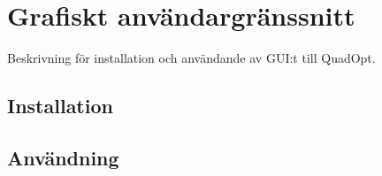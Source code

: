 \section{Grafiskt användargränssnitt}
Beskrivning för installation och användande av GUI:t till QuadOpt.

\subsection{Installation}


\subsection{Användning}
